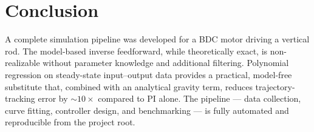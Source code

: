 \documentclass[10pt,twocolumn]{article}
\begin{document}
\section{Conclusion}

A complete simulation pipeline was developed for a BDC motor driving a
vertical rod.  The model-based inverse feedforward, while theoretically
exact, is non-realizable without parameter knowledge and additional
filtering.  Polynomial regression on steady-state input--output data
provides a practical, model-free substitute that, combined with an
analytical gravity term, reduces trajectory-tracking error by
${\sim}10\times$ compared to PI alone. The pipeline --- data
collection, curve fitting, controller design, and benchmarking --- is
fully automated and reproducible from the project root.
\end{document}
